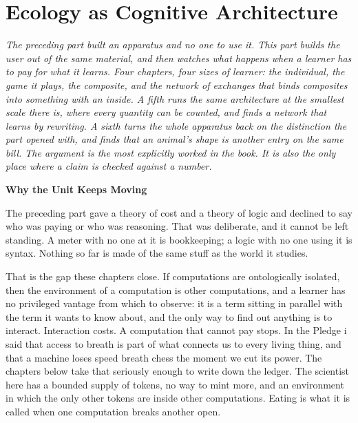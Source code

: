 \documentclass[12pt,openright,twoside]{book}
\theoremstyle{remark}
\theoremstyle{plain}
\theoremstyle{remark}
\theoremstyle{plain}
\theoremstyle{plain}
\begin{document}
\part{Ecology as Cognitive Architecture}
\label{part:ecology}

\vspace{1em}
\begin{mdframed}[backgroundcolor=remarkgray, linecolor=gray!60,
                 linewidth=1pt, topline=false, rightline=false,
                 bottomline=false]
\small\itshape
The preceding part built an apparatus and no one to use it.
This part builds the user out of the same material, and then watches what
happens when a learner has to pay for what it learns.
Four chapters, four sizes of learner: the individual, the game it plays,
the composite, and the network of exchanges that binds composites into
something with an inside.
A fifth runs the same architecture at the smallest scale there is, where
every quantity can be counted, and finds a network that learns by
rewriting.
A sixth turns the whole apparatus back on the distinction the part opened
with, and finds that an animal's shape is another entry on the same bill.
The argument is the most explicitly worked in the book.
It is also the only place where a claim is checked against a number.
\end{mdframed}

\bigskip

{}
{\large\bfseries\color{accentblue} Why the Unit Keeps Moving}
\vspace{0.8em}

\noindent
The preceding part gave a theory of cost and a theory of logic and
declined to say who was paying or who was reasoning.
That was deliberate, and it cannot be left standing.
A meter with no one at it is bookkeeping; a logic with no one using it is
syntax.
Nothing so far is made of the same stuff as the world it studies.

That is the gap these chapters close.
If computations are ontologically isolated, then the environment of a
computation is other computations, and a learner has no privileged
vantage from which to observe: it is a term sitting in parallel with the
term it wants to know about, and the only way to find out anything is to
interact.
Interaction costs.
A computation that cannot pay stops.
In the Pledge i said that access to breath is part of what connects us to
every living thing, and that a machine loses speed breath chess the moment
we cut its power.
The chapters below take that seriously enough to write down the ledger.
The scientist here has a bounded supply of tokens, no way to mint more, and
an environment in which the only other tokens are inside other
computations.
Eating is what it is called when one computation breaks another open.
\end{document}
